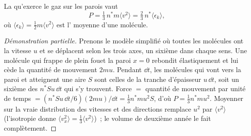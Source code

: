 \begin{theorem}\label{thm:b1:kinetic-theory:pressure}
La  qu'exerce le gaz sur les parois vaut
\[
P = \tfrac13\,n^*m\langle v^2\rangle = \tfrac23\,n^*\langle\epsilon_k\rangle ,
\]
où $\langle\epsilon_k\rangle = \tfrac12 m\langle v^2\rangle$ est l' moyenne d'une molécule.
\end{theorem}

\begin{proof}[Démonstration partielle]
Prenons le modèle simplifié où toutes les molécules ont la vitesse $u$
et se déplacent selon les trois axes, un sixième dans chaque sens. Une
molécule qui frappe de plein fouet la paroi $x = 0$ rebondit
élastiquement et lui cède la quantité de mouvement $2mu$. Pendant $\dd t$,
les molécules qui vont vers la paroi et atteignent une aire $S$ sont
celles de la tranche d'épaisseur $u\,\dd t$, soit un sixième des
$n^*Su\,\dd t$ qui s'y trouvent. Force $= $
quantité de mouvement par unité de temps $= (n^*Su\,\dd t/6)(2mu)/\dd t = \tfrac13 n^*mu^2S$, d'où
$P = \tfrac13 n^*mu^2$. Moyenner sur la vraie distribution des vitesses
et des directions remplace $u^2$ par $\langle v^2\rangle$ (l'isotropie
donne $\langle v_x^2\rangle = \tfrac13\langle v^2\rangle$)~; le volume de
deuxième année le fait complètement.
\end{proof}

